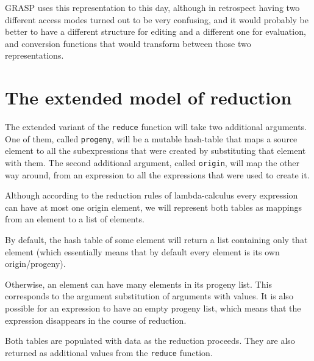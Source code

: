 \documentclass[acmsmall]{acmart}
\begin{document}
GRASP uses this representation to this day, although in retrospect
having two different access modes turned out to be very confusing, and
it would probably be better to have a different structure for editing
and a different one for evaluation, and conversion functions that
would transform between those two representations.

\section{The extended model of reduction}
\label{sec:org4ec7019}

The extended variant of the \texttt{reduce} function will take two additional
arguments. One of them, called \texttt{progeny}, will be a mutable hash-table
that maps a source element to all the subexpressions that were created
by substituting that element with them. The second additional
argument, called \texttt{origin}, will map the other way around, from an
expression to all the expressions that were used to create it.

Although according to the reduction rules of lambda-calculus every
expression can have at most one origin element, we will represent both
tables as mappings from an element to a list of elements.

By default, the hash table of some element will return a list
containing only that element (which essentially means that by default
every element is its own origin/progeny).

Otherwise, an element can have many elements in its progeny list.
This corresponds to the argument substitution of arguments with
values.  It is also possible for an expression to have an empty
progeny list, which means that the expression disappears in the course
of reduction.

Both tables are populated with data as the reduction proceeds.  They
are also returned as additional values from the \texttt{reduce} function.
\end{document}
